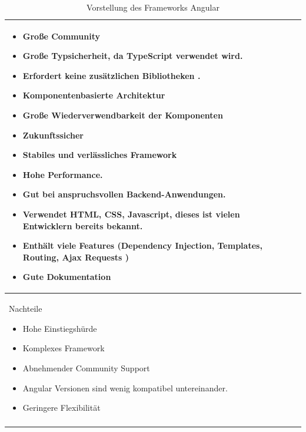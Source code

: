 \begin{longtable}{|l|l|l|}
{	\begin{itemize}
		\itemsep0pt
		\item Große Community \cite{AngularReactVergleich2}
		\item Große Typsicherheit, da TypeScript verwendet wird. \cite{AngularReactVergleich3}
		\item Erfordert keine zusätzlichen Bibliotheken \cite{AngularReactVergleich2}.
		\item \glqq Komponentenbasierte Architektur\grqq{} \cite{AngularReactVergleich5}
		\item Große Wiederverwendbarkeit der Komponenten \cite{AngularReactVergleich4}
		\item \glqq Zukunftssicher\grqq{} \cite{AngularReactVergleich5}
		\item Stabiles und verlässliches Framework \cite{AngularReactVergleich6}
		\item Hohe Performance. \cite{AngularReactVergleich5}
		\item Gut bei anspruchsvollen Backend-Anwendungen. \cite{AngularReactVergleich2}
		\item Verwendet HTML, CSS, Javascript, dieses ist vielen Entwicklern bereits bekannt. \cite{AngularReactVergleich3}
		\item Enthält viele Features (\glqq Dependency Injection, Templates, Routing, Ajax Requests\grqq{} \cite{AngularReactVergleich})
		\item Gute Dokumentation
	\end{itemize}} \\
	\hline
	\hline
	\multicolumn{3}{|p{12.0cm}|}{Nachteile
	
\begin{itemize}
	\itemsep0pt
	\item Hohe Einstiegshürde \cite{AngularReactVergleich2}
	\item Komplexes Framework \cite{AngularReactVergleich4}
	\item Abnehmender Community Support \cite{AngularReactVergleich4}
	\item Angular Versionen sind wenig kompatibel untereinander. \cite{AngularReactVergleich6}
	\item Geringere Flexibilität  \cite{AngularReactVergleich}
\end{itemize}} \\
	\hline
	\caption{Vorstellung des Frameworks Angular}
	\label{tab:dlsc}
\end{longtable}



